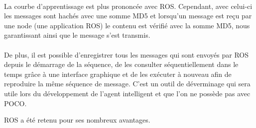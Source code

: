 \paragraph{}La courbe d’apprentissage est plus prononcée avec ROS. Cependant, avec celui-ci les messages sont hachés avec une somme MD5 et lorsqu’un message est reçu par une node (une application ROS) le contenu est vérifié avec la somme MD5, nous garantissant ainsi que le message s’est transmis.

\paragraph{}De plus, il est possible d’enregistrer tous les messages qui sont envoyés par ROS depuis le démarrage de la séquence, de les consulter séquentiellement dans le temps grâce à une interface graphique et de les exécuter à nouveau afin de reproduire la même séquence de message. C’est un outil de déverminage qui sera utile lors du développement de l’agent intelligent et que l’on ne possède pas avec POCO.

ROS a été retenu pour ses nombreux avantages. 
